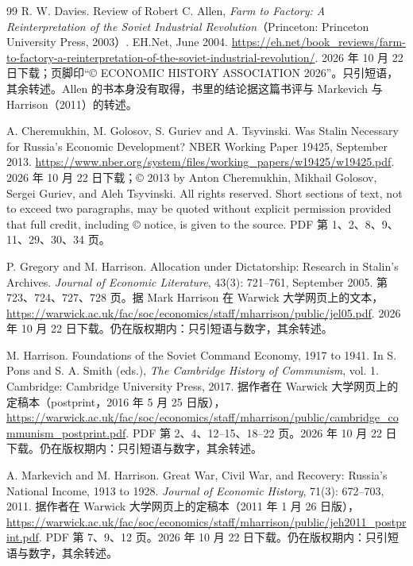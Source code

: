 \begin{thebibliography}{99}
 R. W. Davies. Review of Robert C. Allen, \emph{Farm to Factory: A Reinterpretation of the Soviet Industrial Revolution}（Princeton: Princeton University Press, 2003）. EH.Net, June 2004. \url{https://eh.net/book_reviews/farm-to-factory-a-reinterpretation-of-the-soviet-industrial-revolution/}. 2026 年 10 月 22 日下载；页脚印“© ECONOMIC HISTORY ASSOCIATION 2026”。只引短语，其余转述。Allen 的书本身没有取得，书里的结论据这篇书评与 Markevich 与 Harrison（2011）的转述。

 A. Cheremukhin, M. Golosov, S. Guriev and A. Tsyvinski. Was Stalin Necessary for Russia's Economic Development? NBER Working Paper 19425, September 2013. \url{https://www.nber.org/system/files/working_papers/w19425/w19425.pdf}. 2026 年 10 月 22 日下载；© 2013 by Anton Cheremukhin, Mikhail Golosov, Sergei Guriev, and Aleh Tsyvinski. All rights reserved. Short sections of text, not to exceed two paragraphs, may be quoted without explicit permission provided that full credit, including © notice, is given to the source. PDF 第 1、2、8、9、11、29、30、34 页。

 P. Gregory and M. Harrison. Allocation under Dictatorship: Research in Stalin's Archives. \emph{Journal of Economic Literature}, 43(3): 721--761, September 2005. 第 723、724、727、728 页。据 Mark Harrison 在 Warwick 大学网页上的文本，\url{https://warwick.ac.uk/fac/soc/economics/staff/mharrison/public/jel05.pdf}. 2026 年 10 月 22 日下载。仍在版权期内：只引短语与数字，其余转述。

 M. Harrison. Foundations of the Soviet Command Economy, 1917 to 1941. In S. Pons and S. A. Smith (eds.), \emph{The Cambridge History of Communism}, vol. 1. Cambridge: Cambridge University Press, 2017. 据作者在 Warwick 大学网页上的定稿本（postprint，2016 年 5 月 25 日版），\url{https://warwick.ac.uk/fac/soc/economics/staff/mharrison/public/cambridge_communism_postprint.pdf}. PDF 第 2、4、12--15、18--22 页。2026 年 10 月 22 日下载。仍在版权期内：只引短语与数字，其余转述。

 A. Markevich and M. Harrison. Great War, Civil War, and Recovery: Russia's National Income, 1913 to 1928. \emph{Journal of Economic History}, 71(3): 672--703, 2011. 据作者在 Warwick 大学网页上的定稿本（2011 年 1 月 26 日版），\url{https://warwick.ac.uk/fac/soc/economics/staff/mharrison/public/jeh2011_postprint.pdf}. PDF 第 7、9、12 页。2026 年 10 月 22 日下载。仍在版权期内：只引短语与数字，其余转述。


\end{thebibliography}
